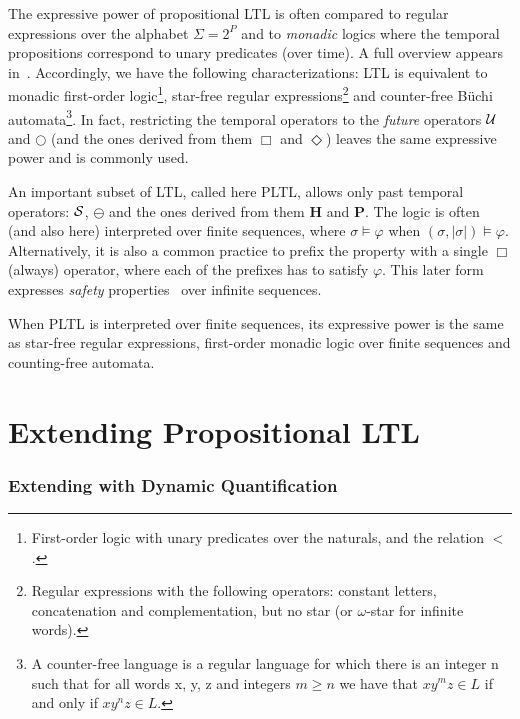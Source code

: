 The expressive power of propositional LTL is often compared to regular expressions
over the alphabet $\Sigma = 2^P$ and to  {\em monadic} logics where the temporal propositions
correspond to unary predicates (over time). A full overview appears in~\cite{Thomas}. Accordingly, we have the following characterizations:
LTL is equivalent to monadic first-order logic\footnote{First-order logic with unary predicates over the naturals, and the relation $<$.},  star-free regular expressions\footnote{Regular expressions with the following operators: constant letters, concatenation and complementation, but no star (or $\omega$-star for infinite words).} and counter-free B\"{u}chi automata\footnote{A counter-free language is a regular language for which there is an integer n such that for all words x, y, z and integers $m \geq n$ we have that $xy^m z \in L$ if and only if $xy^n z \in L$.}. In fact, restricting the temporal operators to the {\em future}  operators $\mathbin{\mathcal{U}}$ and $\bigcirc$
(and the ones derived from them $\Box$ and $\Diamond$)
leaves the same expressive power and is commonly used. 


An important subset of LTL, called here PLTL, allows only past temporal
operators: ${\cal S}$, $\ominus$ and the ones derived
from them $\mathbf{H}$ and $\mathbf{P}$. The logic is often
(and also here) interpreted over finite sequences, 
where $\sigma \models \varphi$ when $( \sigma , | \sigma | ) \models \varphi$.
Alternatively,
it is also a common practice to prefix the property with a single $\Box$ (always) operator, where each of the prefixes has to satisfy $\varphi$. This later
form expresses {\em safety} properties~\cite{AS} over infinite sequences. 



When PLTL is interpreted over finite sequences, its
expressive power is the same as star-free regular expressions, first-order monadic logic over finite sequences and counting-free automata.


\section{Extending Propositional LTL}
\label{sec:extending-prop-ltl}

\subsubsection{Extending with Dynamic Quantification}

